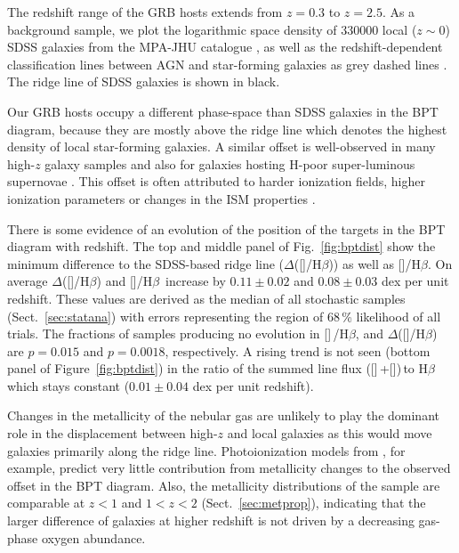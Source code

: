 \documentclass[traditabstract, longauth]{aa}
\newcommand{\hb}{H$\beta$}
\newcommand{\oii}{[\ion{O}{ii}]}
\newcommand{\oiii}{[\ion{O}{iii}]}
\begin{document}
The redshift range of the GRB hosts extends from $z=0.3$ to $z=2.5$. As a background sample, we plot the logarithmic space density of 330000 local ($z\sim0$) SDSS \citep{2009ApJS..182..543A} galaxies from the MPA-JHU catalogue \citep[e.g.,][]{2003MNRAS.346.1055K}, as well as the redshift-dependent classification lines between AGN and star-forming galaxies as grey dashed lines \citep{2013ApJ...774L..10K}. The ridge line of SDSS galaxies \citep{2008MNRAS.385..769B} is shown in black.

Our GRB hosts occupy a different phase-space than SDSS galaxies in the BPT diagram, because they are mostly above the ridge line which denotes the highest density of local star-forming galaxies. A similar offset is well-observed in many high-$z$ galaxy samples \citep[e.g.,][]{2005ApJ...635.1006S, 2007ApJ...669..776K, 2014ApJ...795..165S} and also for galaxies hosting H-poor super-luminous supernovae \citep{2014arXiv1409.8331L}. This offset is often attributed to harder ionization fields, higher ionization parameters or changes in the ISM properties \citep[e.g.,][]{2008MNRAS.385..769B, 2013ApJ...774..100K, 2014ApJ...795..165S}. 

 {There is some evidence of an evolution of the position of the targets in the BPT diagram with redshift. The top and middle panel of Fig.~\ref{fig:bptdist} show the minimum difference to the SDSS-based ridge line ($\Delta$(\oiii/\hb)) as well as \oiii/\hb. On average $\Delta$(\oiii/\hb) and \oiii/\hb\, increase by $0.11\pm0.02$ and $0.08\pm0.03$ dex per unit redshift. These values are derived as the median of all stochastic samples (Sect.~\ref{sec:statana}) with errors representing the region of 68\,\% likelihood of all trials. The fractions of samples producing no evolution in \oiii\,/\hb, and $\Delta$(\oiii/\hb) are $p=0.015$ and $p=0.0018$, respectively. A rising trend is not seen (bottom panel of Figure~\ref{fig:bptdist}) in the ratio of the summed line flux (\oiii\,+\oii)\,to \hb which stays constant ($0.01\pm0.04$ dex per unit redshift).} 

 {Changes in the metallicity of the nebular gas are unlikely to play the dominant role in the displacement between high-$z$ and local galaxies as this would move galaxies primarily along the ridge line. Photoionization models from \citet{2014ApJ...795..165S}, for example, predict very little contribution from metallicity changes to the observed offset in the BPT diagram. Also, the metallicity distributions of the sample are comparable at $z<1$ and $1<z<2$ (Sect.~\ref{sec:metprop}), indicating that the larger difference of galaxies at higher redshift is not driven by a decreasing gas-phase oxygen abundance.}
\end{document}
